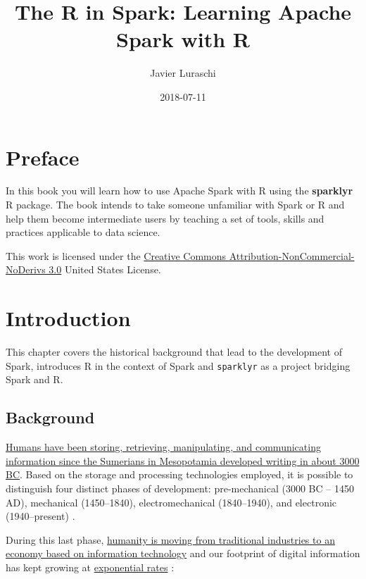 \documentclass[]{book}
\title{The R in Spark: Learning Apache Spark with R}
\author{Javier Luraschi}
\date{2018-07-11}
\theoremstyle{definition}
\theoremstyle{definition}
\theoremstyle{definition}
\theoremstyle{remark}
\begin{document}
\maketitle

{
\setcounter{tocdepth}{1}
\tableofcontents
}
\hypertarget{preface}{%
\chapter*{Preface}\label{preface}}

In this book you will learn how to use Apache Spark with R using the
\textbf{sparklyr} R package. The book intends to take someone unfamiliar
with Spark or R and help them become intermediate users by teaching a
set of tools, skills and practices applicable to data science.

This work is licensed under the
\href{http://creativecommons.org/licenses/by-nc-nd/3.0/us/}{Creative
Commons Attribution-NonCommercial-NoDerivs 3.0} United States License.

\hypertarget{intro}{%
\chapter{Introduction}\label{intro}}

This chapter covers the historical background that lead to the
development of Spark, introduces R in the context of Spark and
\texttt{sparklyr} as a project bridging Spark and R.

\hypertarget{background}{%
\section{Background}\label{background}}

\href{https://en.wikipedia.org/wiki/Information_technology}{Humans have
been storing, retrieving, manipulating, and communicating information
since the Sumerians in Mesopotamia developed writing in about 3000 BC}.
Based on the storage and processing technologies employed, it is
possible to distinguish four distinct phases of development:
pre-mechanical (3000 BC -- 1450 AD), mechanical (1450--1840),
electromechanical (1840--1940), and electronic (1940--present)
\citep{information-technology}.

During this last phase,
\href{https://en.wikipedia.org/wiki/Information_Age}{humanity is moving
from traditional industries to an economy based on information
technology} and our footprint of digital information has kept growing at
\protect\hyperlink{storage-capacity}{exponential rates}
\citep{data-revolution}:
\end{document}
